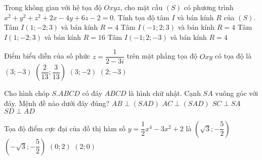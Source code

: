 \begin{ex}%
Trong không gian với hệ tọa độ $Oxyz$, cho mặt cầu $(S)$ có phương trình $x^2+y^2+z^2+2x-4y+6z-2=0$. Tính tọa độ tâm $I$ và bán kính $R$ của $(S)$.
\choice
{Tâm $I(1;-2;3)$ và bán kính $R=4$}
{Tâm $I(-1;2;3)$ và bán kính $R=4$}
{Tâm $I(1;-2;3)$ và bán kính $R=16$}
{\True Tâm $I(-1;2;-3)$ và bán kính $R=4$}
\end{ex}
\begin{ex}%
Điểm biểu diễn của số phức $z=\dfrac{1}{2-3i}$ trên mặt phẳng tọa độ $Oxy$ có tọa độ là
\choice
{$(3;-3)$}
{\True $\left(\dfrac{2}{13};\dfrac{3}{13}\right)$}
{$(3;-2)$}
{$(2;-3)$}
\end{ex}
\begin{ex}%
Cho hình chóp $S.ABCD$ có đáy $ABCD$ là hình chữ nhật. Cạnh $SA$ vuông góc với đáy. Mệnh đề nào dưới đây đúng?
\choice
{\True $AB\perp (SAD)$}
{$AC\perp (SAD)$}
{$SC\perp SA$}
{$SD\perp AD$}
\end{ex}
\begin{ex}%
Tọa độ điểm cực đại của đồ thị hàm số $y=\dfrac{1}{2}x^4-3x^2+2$ là
\choice
{$\left(\sqrt{3};-\dfrac{5}{2}\right)$}
{$\left(-\sqrt{3};-\dfrac{5}{2}\right)$}
{\True $(0;2)$}
{$(2;0)$}
\end{ex}
